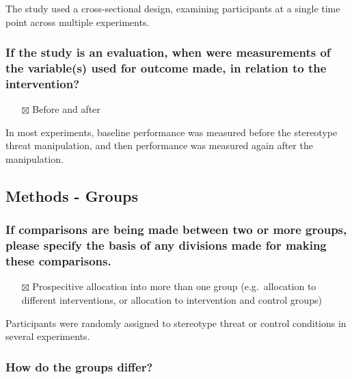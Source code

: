 \documentclass[
  doc, a4paper]{apa7}
\providecommand{\tightlist}{%
  \setlength{\itemsep}{0pt}\setlength{\parskip}{0pt}}
\begin{document}
The study used a cross-sectional design, examining participants at a single time point across multiple experiments.

\subsubsection{If the study is an evaluation, when were measurements of the variable(s) used for outcome made, in relation to the intervention?}\label{if-the-study-is-an-evaluation-when-were-measurements-of-the-variables-used-for-outcome-made-in-relation-to-the-intervention}

\begin{itemize}
\tightlist
\item[$\boxtimes$]
  Before and after
\end{itemize}

In most experiments, baseline performance was measured before the stereotype threat manipulation, and then performance was measured again after the manipulation.

\subsection{Methods - Groups}\label{methods---groups}

\subsubsection{If comparisons are being made between two or more groups, please specify the basis of any divisions made for making these comparisons.}\label{if-comparisons-are-being-made-between-two-or-more-groups-please-specify-the-basis-of-any-divisions-made-for-making-these-comparisons.}

\begin{itemize}
\tightlist
\item[$\boxtimes$]
  Prospecitive allocation into more than one group (e.g.~allocation to different interventions, or allocation to intervention and control groups)
\end{itemize}

Participants were randomly assigned to stereotype threat or control conditions in several experiments.

\subsubsection{How do the groups differ?}\label{how-do-the-groups-differ}
\end{document}
